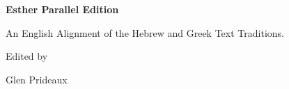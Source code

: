 \begin{titlepage}
\thispagestyle{empty}

\vspace*{\fill}

\begin{center}

{\Huge\bfseries Esther Parallel Edition\par}

\vspace{1.5em}

{\Large
An English Alignment of the
Hebrew and Greek Text Traditions.\par}

\vspace{3em}

{\large Edited by\par}

\vspace{0.5em}

{\Large Glen Prideaux\par}

\end{center}

\vspace*{\fill}

\end{titlepage}